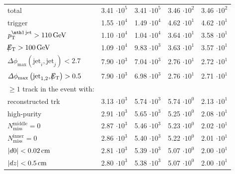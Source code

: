 \begin{table}[!h]
{\begin{tabular}{|l|c|c|c|c|}
total                                                                                & 3.41 $\cdot10^{5 }$ & 3.41 $\cdot10^{5 }$ & 3.46 $\cdot10^{2 }$ & 3.46 $\cdot10^{2 }$ \\
trigger                                                                                   & 1.55 $\cdot10^{4 }$ & 1.49 $\cdot10^{4 }$ & 4.62 $\cdot10^{1 }$ & 4.62 $\cdot10^{1 }$ \\
$\ptfirstjet>110\gev$                                                                     & 1.10 $\cdot10^{4 }$ & 1.04 $\cdot10^{4 }$ & 3.64 $\cdot10^{1 }$ & 3.58 $\cdot10^{1 }$ \\
$\slash\mkern-12mu{E}_{\text{T}}>100\,\text{Ge}\kern-0.06667em\text{V}$                                                                            & 1.09 $\cdot10^{4 }$ & 9.83 $\cdot10^{3 }$ & 3.63 $\cdot10^{1 }$ & 3.57 $\cdot10^{1 }$ \\
$\Delta\phi_{\text{max}} \left( \text{jet}_i, \text{jet}_j  \right)<2.7$                  & 7.90 $\cdot10^{3 }$ & 7.04 $\cdot10^{3 }$ & 2.76 $\cdot10^{1 }$ & 2.72 $\cdot10^{1 }$ \\
$\Delta\phi_{\text{max}} \left( \text{jet}_{1,2}, \slash\mkern-12mu{E}_{\text{T}}  \right)>0.5$                          & 7.90 $\cdot10^{3 }$ & 6.98 $\cdot10^{3 }$ & 2.76 $\cdot10^{1 }$ & 2.71 $\cdot10^{1 }$ \\
$\geq1$ track in the event with:                                                          &&&&\\
reconstructed trk                                                                         & 3.13 $\cdot10^{3 }$ & 5.74 $\cdot10^{3 }$ & 5.74 $\cdot10^{0 }$ & 2.13 $\cdot10^{1 }$ \\
high-purity                                                                               & 2.91 $\cdot10^{3 }$ & 5.65 $\cdot10^{3 }$ & 5.25 $\cdot10^{0 }$ & 2.08 $\cdot10^{1 }$ \\
$N_{\text{miss}}^{\text{middle}}=0$                                                       & 2.87 $\cdot10^{3 }$ & 5.46 $\cdot10^{3 }$ & 5.23 $\cdot10^{0 }$ & 2.02 $\cdot10^{1 }$ \\
$N_{\text{miss}}^{\text{inner}}=0$                                                        & 2.86 $\cdot10^{3 }$ & 5.40 $\cdot10^{3 }$ & 5.22 $\cdot10^{0 }$ & 2.01 $\cdot10^{1 }$ \\
$|d0|<0.02\,\text{cm}$                                                                            & 2.81 $\cdot10^{3 }$ & 5.39 $\cdot10^{3 }$ & 5.07 $\cdot10^{0 }$ & 2.00 $\cdot10^{1 }$ \\
$|dz|<0.5\,\text{cm}$                                                                             & 2.80 $\cdot10^{3 }$ & 5.38 $\cdot10^{3 }$ & 5.07 $\cdot10^{0 }$ & 2.00 $\cdot10^{1 }$ \\

\end{tabular}}
\end{table}
